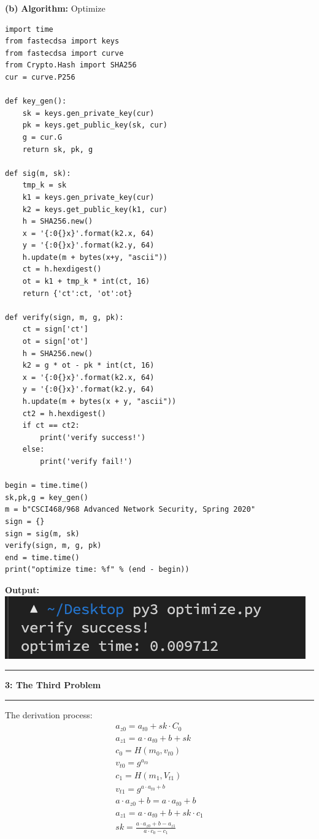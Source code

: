 \documentclass[11pt]{article}
\newcommand\question[2]{\vspace{.25in}\hrule\textbf{#1: #2}\vspace{.5em}\hrule\vspace{.10in}}
\renewcommand\part[1]{\vspace{.10in}\textbf{(#1)}}
\newcommand\al{\vspace{.10in}\textbf{Algorithm: }}
\newcommand\ot{\vspace{.10in}\textbf{Output: }}
\begin{document}
\part{b}  \al Optimize\\
\begin{lstlisting}
import time
from fastecdsa import keys
from fastecdsa import curve
from Crypto.Hash import SHA256
cur = curve.P256

def key_gen():
    sk = keys.gen_private_key(cur)
    pk = keys.get_public_key(sk, cur)
    g = cur.G
    return sk, pk, g

def sig(m, sk):
    tmp_k = sk
    k1 = keys.gen_private_key(cur)
    k2 = keys.get_public_key(k1, cur)
    h = SHA256.new()
    x = '{:0{}x}'.format(k2.x, 64)
    y = '{:0{}x}'.format(k2.y, 64)
    h.update(m + bytes(x+y, "ascii"))
    ct = h.hexdigest()
    ot = k1 + tmp_k * int(ct, 16)
    return {'ct':ct, 'ot':ot}

def verify(sign, m, g, pk):
    ct = sign['ct']
    ot = sign['ot']
    h = SHA256.new()
    k2 = g * ot - pk * int(ct, 16)
    x = '{:0{}x}'.format(k2.x, 64)
    y = '{:0{}x}'.format(k2.y, 64) 
    h.update(m + bytes(x + y, "ascii"))
    ct2 = h.hexdigest()
    if ct == ct2:
        print('verify success!')
    else:
        print('verify fail!')

begin = time.time()
sk,pk,g = key_gen()
m = b"CSCI468/968 Advanced Network Security, Spring 2020"
sign = {}
sign = sig(m, sk)
verify(sign, m, g, pk)
end = time.time()
print("optimize time: %f" % (end - begin))
\end{lstlisting}

\ot\\
\includegraphics{ot2.png}

\question{3}{The Third Problem}
The derivation process:
\begin{gather}
    a_{z0} = a_{t0} + sk \cdot C_0\\
    a_{z1} = a \cdot a_{t0} + b + sk\\
    c_0 = H(m_0,v_{t0})\\
    v_{t0} = g^{a_{t0}}\\
    c_1 = H(m_1, V_{t1})\\
    v_{t1} = g^{a \cdot a_{t0} + b}\\
    a \cdot a_{z0} + b = a \cdot a_{t0} + b\\
    a_{z1} = a \cdot a_{t0} + b + sk \cdot c_1\\
    sk = \frac{a \cdot a_{z0} + b - a_{z1}}{a \cdot c_0 - c_1}
\end{gather}
\end{document}
